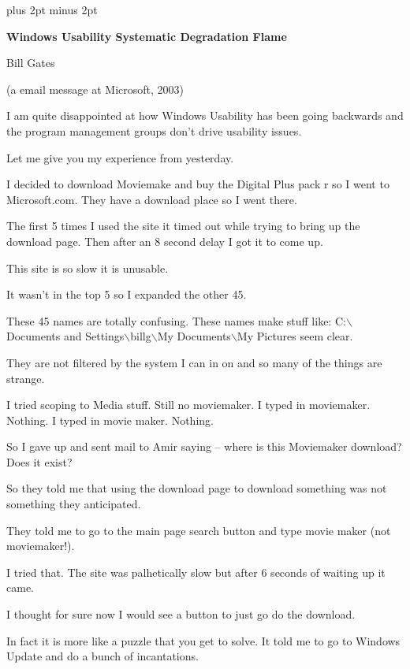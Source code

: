 \parindent=0pt\parskip=10pt plus 2pt minus 2pt%
\centerline{\bf Windows Usability Systematic Degradation Flame}
\centerline{Bill Gates}
\centerline{(a email message at Microsoft, 2003)}

\bigskip
{}
\medskip

I am quite disappointed at how Windows Usability has been going backwards and
the program management groups don't drive usability issues.

Let me give you my experience from yesterday.

I decided to download Moviemake and buy the Digital Plus pack r so I went to Microsoft.com.
They have a download place so I went there.

The first 5 times I used the site it timed out while trying to bring up the download page.
Then after an 8 second delay I got it to come up.

This site is so slow it is unusable.

It wasn't in the top 5 so I expanded the other 45.

These 45 names are totally confusing.
These names make stuff like:
C:$\backslash$Documents and Settings$\backslash$billg$\backslash$My
Documents$\backslash$My Pictures seem clear.

They are not filtered by the system I can in on and so many of the things are
strange.

I tried scoping to Media stuff.
Still no moviemaker.
I typed in moviemaker. Nothing.
I typed in movie maker. Nothing.

So I gave up and sent mail to Amir saying -- where is this Moviemaker
download? Does it exist?

So they told me that using the download page to download something was not
something they anticipated.

They told me to go to the main page search button and type movie maker (not
moviemaker!).

I tried that.
The site was palhetically slow but after 6 seconds of waiting up it came.

I thought for sure now I would see a button to just go do the download.

In fact it is more like a puzzle that you get to solve.
It told me to go to Windows Update and do a bunch of incantations.

